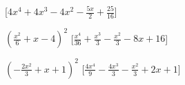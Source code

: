 \begin{esercizio}
\begin{enumeratea}
  \hfill [\(4 x^{4} + 4 x^{3} - 4 x^{2} - \frac{5 x}{2} + \frac{25}{16}\)]
\item \(\left(\frac{x^{2}}{6} + x - 4\right)^{2}\)
  \hfill [\(\frac{x^{4}}{36} + \frac{x^{3}}{3} - \frac{x^{2}}{3} - 8 x + 
16\)]
\item \(\left(- \frac{2 x^{2}}{3} + x + 1\right)^{2}\)
  \hfill [\(\frac{4 x^{4}}{9} - \frac{4 x^{3}}{3} - \frac{x^{2}}{3} + 2 x + 
1\)]

\end{enumeratea}
\end{esercizio}
